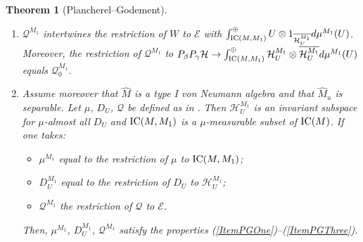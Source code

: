 \documentclass[pdftex]{sigma}
\numberwithin{equation}{section}
\newtheorem{thm}{Theorem}[section]
\theoremstyle{definition}
\newcommand{\cHil}{\mathcal{H}}
\newcommand{\ICM}{\text{\rm IC}(M)}
\newcommand{\ICMM}{\text{\rm IC}(M, M_1)}
\begin{document}
\begin{thm}[Plancherel--Godement]
\begin{enumerate}
\item\label{ItemPGThree}
$\mathcal{Q}^{M_1}$ intertwines the restriction of $W$ to $\mathcal{E}$ with $\int^\oplus_{\ICMM}  U \otimes 1_{\overline{\cHil_U^{M_1}}}d\mu^{M_1}(U)$. Moreover, the restriction of $\mathcal{Q}^{M_1}$ to $P_\beta P_\gamma \cHil \rightarrow \int^\oplus_{\ICMM}  \cHil_U^{M_1} \otimes \overline{\cHil_U^{M_1}} d\mu^{M_1}(U)$ equals $\mathcal{Q}^{M_1}_0$.

\item\label{ItemPGFour}  Assume moreover that $\hat{M}$ is a type I von Neumann algebra and that $\hat{M}_u$ is separable. Let $\mu$, $D_U$, $\mathcal{Q}$ be defined as in {\rm \cite[{\it Theorem} 3.4.1]{Des}}. Then $\cHil_U^{M_1}$ is an invariant subspace for $\mu$-almost all $D_U$ and $\ICMM$ is a $\mu$-measurable subset of $\ICM$. If one takes:
\begin{itemize}\itemsep=0pt
\item  $\mu^{M_1}$  equal to the restriction of $\mu$ to $\ICMM$;
\item $D_U^{M_1}$ equal to the restriction of $D_U$ to $\cHil_U^{M_1}$;
\item $\mathcal{Q}^{M_1}$ the restriction of $\mathcal{Q}$ to $\mathcal{E}$.
\end{itemize}
Then, $\mu^{M_1}$, $D_U^{M_1}$, $\mathcal{Q}^{M_1}$ satisfy the properties {\rm (\ref{ItemPGOne})}--{\rm (\ref{ItemPGThree})}.
\end{enumerate}
\end{thm}
\end{document}
